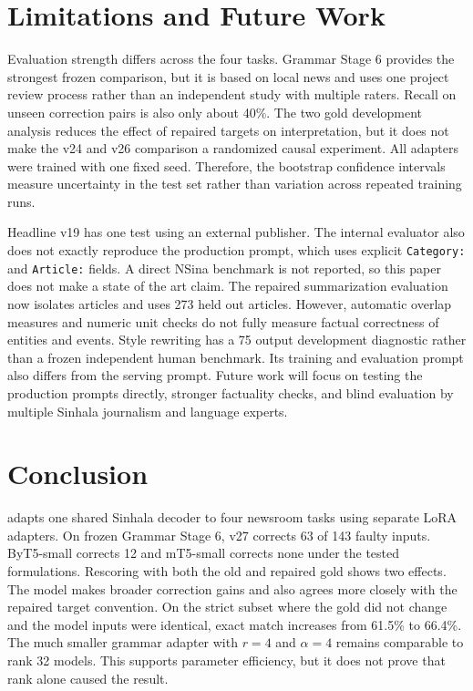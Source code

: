 \documentclass[a4paper,conference]{IEEEtran}
\begin{document}
\section{Limitations and Future Work}
Evaluation strength differs across the four tasks. Grammar Stage 6 provides the
strongest frozen comparison, but it is based on local news and uses one project
review process rather than an independent study with multiple raters. Recall on
unseen correction pairs is also only about 40\%. The two gold development
analysis reduces the effect of repaired targets on interpretation, but it does
not make the v24 and v26 comparison a randomized causal experiment. All
adapters were trained with one fixed seed. Therefore, the bootstrap confidence
intervals measure uncertainty in the test set rather than variation across
repeated training runs.

Headline v19 has one test using an external publisher. The internal evaluator
also does not exactly reproduce the production prompt, which uses explicit
\texttt{Category:} and \texttt{Article:} fields. A direct NSina benchmark is
not reported, so this paper does not make a state of the art claim. The repaired
summarization evaluation now isolates articles and uses 273 held out articles.
However, automatic overlap measures and numeric unit checks do not fully
measure factual correctness of entities and events. Style rewriting has a 75
output development diagnostic rather than a frozen independent human benchmark.
Its training and evaluation prompt also differs from the serving prompt. Future
work will focus on testing the production prompts directly, stronger factuality
checks, and blind evaluation by multiple Sinhala journalism and language
experts.

\balance
\section{Conclusion}
\systemname{} adapts one shared Sinhala decoder to four newsroom tasks using
separate LoRA adapters. On frozen Grammar Stage 6, v27 corrects 63 of 143 faulty
inputs. ByT5-small corrects 12 and mT5-small corrects none under the tested
formulations. Rescoring with both the old and repaired gold shows two effects.
The model makes broader correction gains and also agrees more closely with the
repaired target convention. On the strict subset where the gold did not change
and the model inputs were identical, exact match increases from 61.5\% to
66.4\%. The much smaller grammar adapter with $r=4$ and $\alpha=4$ remains
comparable to rank 32 models. This supports parameter efficiency, but it does
not prove that rank alone caused the result.
\end{document}
